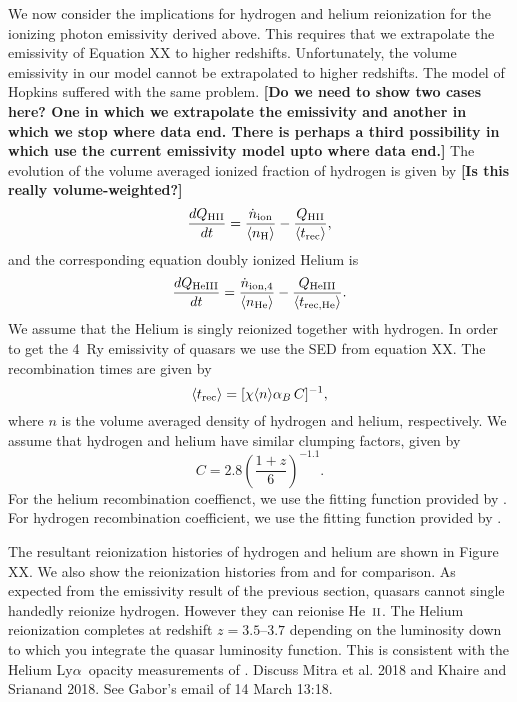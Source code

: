\documentclass[a4paper,fleqn,usenatbib]{mnras}
\def\lya{Ly$\alpha$~}
\newcommand{\gk}[1]{{\bf \color{notecolor} [#1]}}
\def\nH{{\rm H}}
\def\nHII{{\rm HII}}
\def\nHe{{\rm He}}
\def\nHeIII{{\rm HeIII}}
\def\HeII{\hbox{He~$\scriptstyle\rm II$}}
\begin{document}
We now consider the implications for hydrogen and helium reionization
for the ionizing photon emissivity derived above.  This requires that
we extrapolate the emissivity of Equation XX to higher redshifts.
Unfortunately, the volume emissivity in our model cannot be
extrapolated to higher redshifts.  The model of Hopkins suffered with
the same problem.  \gk{Do we need to show two cases here?  One in
  which we extrapolate the emissivity and another in which we stop
  where data end.  There is perhaps a third possibility in which use
  the current emissivity model upto where data end.}  The evolution of
the volume averaged ionized fraction of hydrogen is given by \gk{Is
  this really volume-weighted?}  \citep{2012ApJ...746..125H}
\begin{equation}
{dQ_\nHII\over dt}={\dot n_{\rm ion}\over \langle n_\nH \rangle} -{Q_\nHII\over
\langle t_{\rm rec}\rangle},
\label{eq:qdot}
\end{equation}
and the corresponding equation doubly ionized Helium is
\begin{equation}
{dQ_\nHeIII\over dt}={\dot n_{\rm ion,4}\over \langle n_\nHe \rangle} -{Q_\nHeIII\over
\langle t_{\rm rec,He}\rangle}.
\label{eq:qHedot}
\end{equation}
We assume that the Helium is singly reionized together with hydrogen.
In order to get the 4~Ry emissivity of quasars we use the SED from
equation XX.  The recombination times are given by
\begin{equation}
\langle t_{\rm rec}\rangle=[\chi \langle n\rangle \alpha_B\,C]^{-1},
\label{eq:trec}
\end{equation}
where $n$ is the volume averaged density of hydrogen and helium,
respectively.  We assume that hydrogen and helium have similar
clumping factors, given by \citep{2015ApJ...813L...8M}
\begin{equation}
  C = 2.8\left(\frac{1+z}{6}\right)^{-1.1}.
\end{equation}
For the helium recombination coeffienct, we use the fitting function
provided by \citet{1997MNRAS.292...27H}.  For hydrogen recombination
coefficient, we use the fitting function provided by
\citet{2011piim.book.....D}.

The resultant reionization histories of hydrogen and helium are shown
in Figure XX.  We also show the reionization histories from
\citep{2012ApJ...746..125H} and \citep{2015ApJ...813L...8M} for
comparison.  As expected from the emissivity result of the previous
section, quasars cannot single handedly reionize hydrogen.  However
they can reionise \HeII.  The Helium reionization completes at
redshift $z=3.5$--$3.7$ depending on the luminosity down to which you
integrate the quasar luminosity function.  This is consistent with the
Helium \lya opacity measurements of \citet{2016ApJ...825..144W}.
Discuss Mitra et al. 2018 and Khaire and Srianand 2018.  See Gabor's
email of 14 March 13:18.
\end{document}
